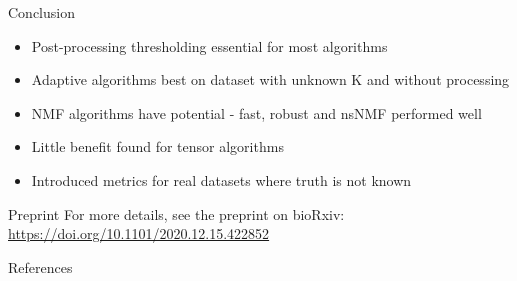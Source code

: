 \documentclass[xcolor=table,final]{beamer}
\newlength{\onecolwid}
\begin{document}
\begin{frame}[t]
\begin{columns}[t]
\begin{column}{\onecolwid}
\begin{block}{Conclusion}
\begin{itemize}
    \item Post-processing thresholding essential for most algorithms
    \item Adaptive algorithms best on dataset with unknown K and without processing
    \item NMF algorithms have potential - fast, robust and nsNMF performed well
    \item Little benefit found for tensor algorithms
    \item Introduced metrics for real datasets where truth is not known
\end{itemize}

\end{block}

\begin{alertblock}{Preprint}
For more details, see the preprint on bioRxiv: \\
\small \url{https://doi.org/10.1101/2020.12.15.422852}
\end{alertblock}


\begin{block}{References}

\nocite{*} %
{
}

\end{block}



\end{column}
\end{columns}
\end{frame}
\end{document}

